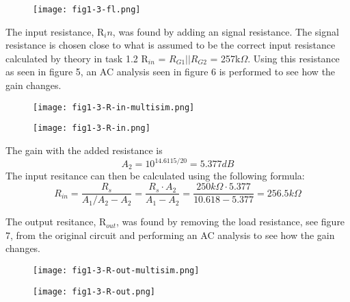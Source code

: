   \begin{figure}[h!]
        \centering
        \texttt{[image: fig1-3-fl.png]}
  \end{figure}

  \pagebreak

  The input resistance, R$_in$, was found by adding an signal resistance. The signal resistance is chosen close to what is assumed to be the correct input resistance calculated by theory in task 1.2 R$_{in}$ = $R_{G1}||R_{G2}$ = 257k$\Omega$. Using this resistance as seen in figure 5, an AC analysis seen in figure 6 is performed to see how the gain changes.\\
  
  \begin{figure}[h!]
        \centering
        \texttt{[image: fig1-3-R-in-multisim.png]}
  \end{figure}

  \begin{figure}[h!]
        \centering
        \texttt{[image: fig1-3-R-in.png]}
  \end{figure}

The gain with the added resistance is $$A_2 = 10^{14.6115/20} = 5.377 dB$$
The input resitance can then be calculated using the following formula:
$$R_{in} = \frac{R_s}{A_1 / A_2 - A_2} = \frac{R_s \cdot A_2}{A_1 - A_2} = \frac{250k\Omega \cdot 5.377}{10.618 - 5.377} = 256.5 k\Omega$$

\pagebreak

The output resitance, R$_{out}$, was found by removing the load resistance, see figure 7, from the original circuit and performing an AC analysis to see how the gain changes.\\

\begin{figure}[h!]
        \centering
        \texttt{[image: fig1-3-R-out-multisim.png]}
  \end{figure}

  \begin{figure}[h!]
        \centering
        \texttt{[image: fig1-3-R-out.png]}
  \end{figure}

